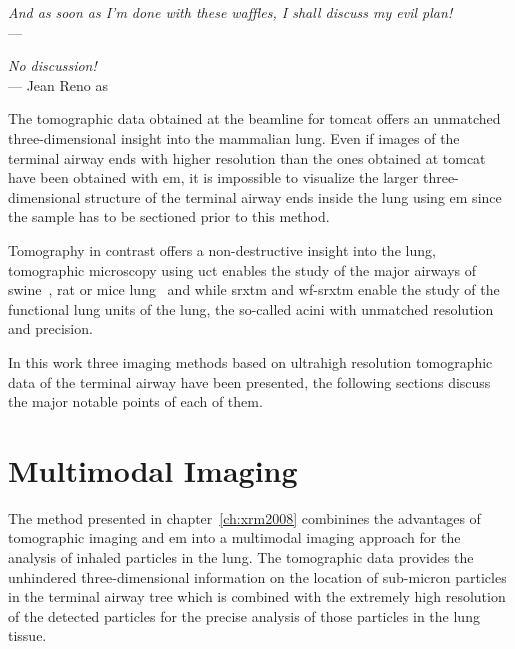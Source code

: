 \acresetall
{}\label{ch:discussion}
\begin{flushright}{\slshape And as soon as I'm done with these waffles, I shall discuss my evil  plan!} \\ \medskip
    ---  \citep{Zim}
\end{flushright}
\begin{flushright}{\slshape No discussion!} \\ \medskip
    --- Jean Reno as \citep{Leon}
\end{flushright}
\vspace{52mm}
The tomographic data obtained at the beamline for \ac{tomcat} offers an unmatched three-dimensional insight into the mammalian lung. Even if images of the terminal airway ends with higher resolution than the ones obtained at \ac{tomcat} have been obtained with \ac{em}, it is impossible to visualize the larger three-dimensional structure of the terminal airway ends inside the lung using \ac{em} since the sample has to be sectioned prior to this method.

Tomography in contrast offers a non-destructive insight into the lung, tomographic microscopy using \ac{uct} enables the study of the major airways of swine~\cite{Litzlbauer2006}, rat  or mice lung~\cite{Langheinrich2004} and while \ac{srxtm} and \ac{wf-srxtm} enable the study of the functional lung units of the lung, the so-called acini with unmatched resolution and precision.

In this work three imaging methods based on ultrahigh resolution tomographic data of the terminal airway have been presented, the following sections discuss the major notable points of each of them.

\section{Multimodal Imaging}
The method presented in chapter~\ref{ch:xrm2008} combinines the advantages of tomographic imaging and \ac{em} into a multimodal imaging approach for the analysis of inhaled particles in the lung. The tomographic data provides the unhindered three-dimensional information on the location of sub-micron particles in the terminal airway tree which is combined with the extremely high resolution of the detected particles for the precise analysis of those particles in the lung tissue.

